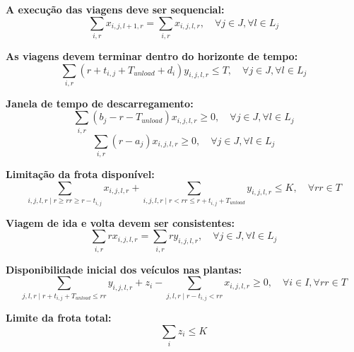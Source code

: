 \textbf{A execução das viagens deve ser sequencial:}
\begin{equation}
    \sum_{i,r} x_{i,j,l+1,r} = \sum_{i,r} x_{i,j,l,r}, \quad \forall j \in J, \forall l \in L_j
\end{equation}

\textbf{As viagens devem terminar dentro do horizonte de tempo:}
\begin{equation}
    \sum_{i,r} (r + t_{i,j} + T_{unload} + d_{i}) y_{i,j,l,r} \leq T, \quad \forall j \in J, \forall l \in L_j
\end{equation}

\textbf{Janela de tempo de descarregamento:}
\begin{equation}
    \sum_{i,r} (b_j - r - T_{unload}) x_{i,j,l,r} \geq 0, \quad \forall j \in J, \forall l \in L_j
\end{equation}
\begin{equation}
    \sum_{i,r} (r - a_j) x_{i,j,l,r} \geq 0, \quad \forall j \in J, \forall l \in L_j
\end{equation}

\textbf{Limitação da frota disponível:}
\begin{equation}
  \sum_{i,j,l,r \mid r \geq rr \geq r - t_{i,j}} x_{i,j,l,r} +
  \sum_{i,j,l,r \mid r < rr \leq r + t_{i,j} + T_{unload}} y_{i,j,l,r} 
  \leq K, \quad \forall rr \in T
\end{equation}

\textbf{Viagem de ida e volta devem ser consistentes:}
\begin{equation}
    \sum_{i,r} r x_{i,j,l,r} = \sum_{i,r} r y_{i,j,l,r}, \quad \forall j \in J, \forall l \in L_j
\end{equation}

\textbf{Disponibilidade inicial dos veículos nas plantas:}
\begin{equation}
  \sum_{j,l,r \mid r + t_{i,j} + T_{unload} \leq rr} y_{i,j,l,r} + z_i -
  \sum_{j,l,r \mid r - t_{i,j} < rr} x_{i,j,l,r} \geq 0, \quad \forall i \in I, \forall rr \in T
\end{equation}

\textbf{Limite da frota total:}
\begin{equation}
    \sum_{i} z_i \leq K
\end{equation}
